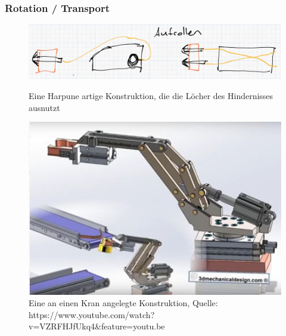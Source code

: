 \subsubsection{Rotation / Transport}
\begin{figure}[h!]
    \centering
    \begin{minipage}{0.45\textwidth}
        \centering
        \includegraphics[width=\textwidth]{img/technologierecherche/Rotation/harponne.jpg}
        \caption{Eine Harpune artige Konstruktion, die die Löcher des Hindernisses ausnutzt}
        \label{img:tech_harponne}
    \end{minipage}
    \hfill
    \begin{minipage}{0.45\textwidth}
        \centering
        \includegraphics[width=\textwidth]{img/technologierecherche/Rotation/kran.jpg}
        \caption{Eine an einen Kran angelegte Konstruktion, Quelle: https://www.youtube.com/watch?v=VZRFHJfUkq4\&feature=youtu.be} 
        \label{img:tech_kran}
    \end{minipage}
\end{figure}

